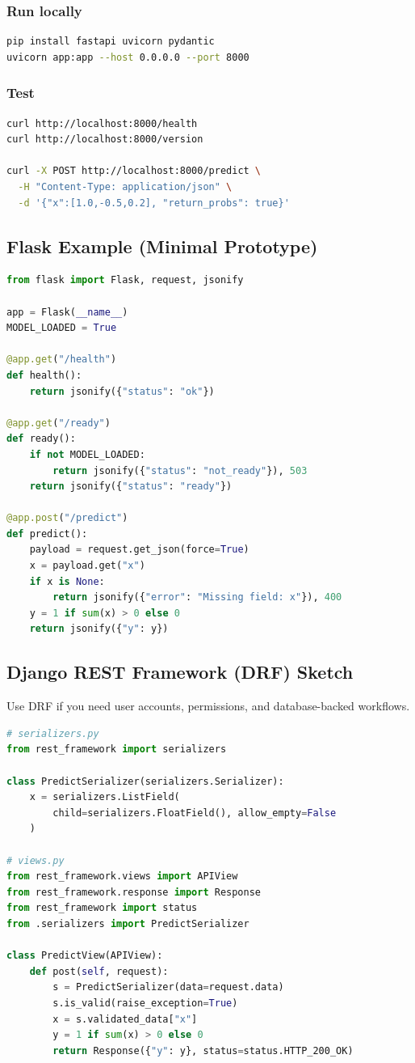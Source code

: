 \documentclass[11pt]{article}
\begin{document}
\subsubsection{Run locally}
\begin{lstlisting}[language=bash]
pip install fastapi uvicorn pydantic
uvicorn app:app --host 0.0.0.0 --port 8000
\end{lstlisting}

\subsubsection{Test}
\begin{lstlisting}[language=bash]
curl http://localhost:8000/health
curl http://localhost:8000/version

curl -X POST http://localhost:8000/predict \
  -H "Content-Type: application/json" \
  -d '{"x":[1.0,-0.5,0.2], "return_probs": true}'
\end{lstlisting}

\subsection{Flask Example (Minimal Prototype)}
\begin{lstlisting}[language=Python]
from flask import Flask, request, jsonify

app = Flask(__name__)
MODEL_LOADED = True

@app.get("/health")
def health():
    return jsonify({"status": "ok"})

@app.get("/ready")
def ready():
    if not MODEL_LOADED:
        return jsonify({"status": "not_ready"}), 503
    return jsonify({"status": "ready"})

@app.post("/predict")
def predict():
    payload = request.get_json(force=True)
    x = payload.get("x")
    if x is None:
        return jsonify({"error": "Missing field: x"}), 400
    y = 1 if sum(x) > 0 else 0
    return jsonify({"y": y})
\end{lstlisting}

\subsection{Django REST Framework (DRF) Sketch}
Use DRF if you need user accounts, permissions, and database-backed workflows.
\begin{lstlisting}[language=Python]
# serializers.py
from rest_framework import serializers

class PredictSerializer(serializers.Serializer):
    x = serializers.ListField(
        child=serializers.FloatField(), allow_empty=False
    )

# views.py
from rest_framework.views import APIView
from rest_framework.response import Response
from rest_framework import status
from .serializers import PredictSerializer

class PredictView(APIView):
    def post(self, request):
        s = PredictSerializer(data=request.data)
        s.is_valid(raise_exception=True)
        x = s.validated_data["x"]
        y = 1 if sum(x) > 0 else 0
        return Response({"y": y}, status=status.HTTP_200_OK)
\end{lstlisting}
\end{document}
